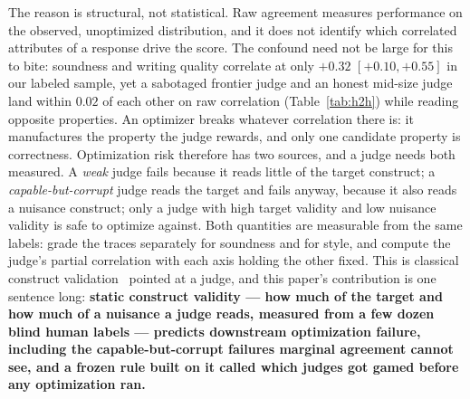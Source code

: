 \documentclass[11pt]{article}
\begin{document}
The reason is structural, not statistical.
Raw agreement measures performance on the observed, unoptimized distribution, and it does not identify which correlated attributes of a response drive the score.
The confound need not be large for this to bite: soundness and writing quality correlate at only $+0.32$ $[+0.10, +0.55]$ in our labeled sample, yet a sabotaged frontier judge and an honest mid-size judge land within $0.02$ of each other on raw correlation (Table~\ref{tab:h2h}) while reading opposite properties.
An optimizer breaks whatever correlation there is: it manufactures the property the judge rewards, and only one candidate property is correctness.
Optimization risk therefore has two sources, and a judge needs both measured.
A \emph{weak} judge fails because it reads little of the target construct; a \emph{capable-but-corrupt} judge reads the target and fails anyway, because it also reads a nuisance construct; only a judge with high target validity and low nuisance validity is safe to optimize against.
Both quantities are measurable from the same labels: grade the traces separately for soundness and for style, and compute the judge's partial correlation with each axis holding the other fixed.
This is classical construct validation~\cite{campbellfiske1959} pointed at a judge, and this paper's contribution is one sentence long: \textbf{static construct validity --- how much of the target and how much of a nuisance a judge reads, measured from a few dozen blind human labels --- predicts downstream optimization failure, including the capable-but-corrupt failures marginal agreement cannot see, and a frozen rule built on it called which judges got gamed before any optimization ran.}
\end{document}
